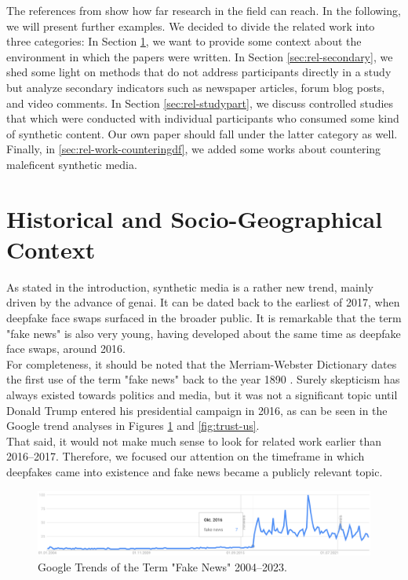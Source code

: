 \documentclass[
  a4paper,  %
  twoside,  %
  bibliography=totoc,
  headsepline,
  cleardoublepage=empty,
  parskip=half,
  draft=false
]{scrbook}
\begin{document}
The references from \citet{hancockSocialImpactDeepfakes2021} show how far research in the field can reach. In the following, we will present further examples. We decided to divide the related work into three categories: In Section \ref{sec:hist-context}, we want to provide some context about the environment in which the papers were written. In Section \ref{sec:rel-secondary}, we shed some light on methods that do not address participants directly in a study but analyze secondary indicators such as newspaper articles, forum blog posts, and video comments. In Section \ref{sec:rel-studypart}, we discuss controlled studies that which were conducted with individual participants who consumed some kind of synthetic content. Our own paper should fall under the latter category as well. Finally, in \ref{sec:rel-work-counteringdf}, we added some works about countering maleficent synthetic media.

\section{Historical and Socio-Geographical Context}
\label{sec:hist-context}
As stated in the introduction, synthetic media is a rather new trend, mainly driven by the advance of \gls{genai}. It can be dated back to the earliest of 2017, when deepfake face swaps surfaced in the broader public. It is remarkable that the term "fake news" is also very young, having developed about the same time as deepfake face swaps, around 2016. \\
For completeness, it should be noted that the Merriam-Webster Dictionary dates the first use of the term "fake news" back to the year 1890 \cite{merriam-websterdictionaryRealStoryFake}. Surely skepticism has always existed towards politics and media, but it was not a significant topic until Donald Trump entered his presidential campaign in 2016, as can be seen in the Google trend analyses in Figures \ref{fig:gtrend-fake-news} and \ref{fig:trust-us}. \\
That said, it would not make much sense to look for related work earlier than 2016–2017. Therefore, we focused our attention on the timeframe in which deepfakes came into existence and fake news became a publicly relevant topic.

\begin{figure}[h]
  \centering
  \includegraphics[width=1\textwidth]{./graphics/gtrends_fakenews_1011-2311.png}
  \caption{Google Trends of the Term "Fake News" 2004–2023.}
  \label{fig:gtrend-fake-news}
\end{figure}
\end{document}
